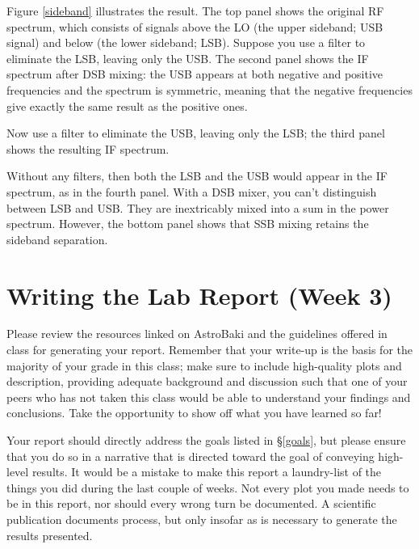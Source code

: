 \documentclass[11pt,preprint]{aastex}
\begin{document}
%
%
%
Figure \ref{sideband} illustrates the result. The top panel shows the
original RF spectrum, which consists of signals above the LO (the upper
sideband; USB
signal) and below (the lower sideband; LSB). Suppose you use a filter to
eliminate the LSB, leaving only the USB. The second panel
shows the IF spectrum after DSB mixing: the USB appears at both negative
and positive frequencies and the spectrum is symmetric, meaning that the
negative frequencies give exactly the same result as the positive ones.

Now use a filter to eliminate the USB, leaving only the LSB;
the third panel shows the resulting IF spectrum.

Without any filters, then both the LSB and the USB
would appear in the IF spectrum, as in the fourth panel. 
With a DSB mixer, you can't distinguish between LSB and
USB. They are inextricably
mixed into a sum in the power spectrum.
However, the bottom panel shows that SSB 
mixing retains the sideband separation.

\section{Writing the Lab Report (Week 3)} \label{report}

\noindent
Please review the resources linked on AstroBaki and the guidelines
offered in class for generating your report. Remember that your write-up
is the basis for the majority of your grade in this class; make sure to
include high-quality plots and description, providing adequate background
and discussion such that one of your peers who has not taken this class would
be able to understand your findings and conclusions. Take the opportunity to
show off what you have learned so far!

Your report should directly address the goals listed in \S\ref{goals}, but
please ensure that you do so in a narrative that is directed toward the goal
of conveying high-level results.  It would be a mistake to make this report a
laundry-list of the things you did during the last couple of weeks. Not every
plot you made needs to be in this report, nor should every wrong turn be documented.
A scientific publication documents process, but only insofar as is necessary
to generate the results presented.
\end{document}
